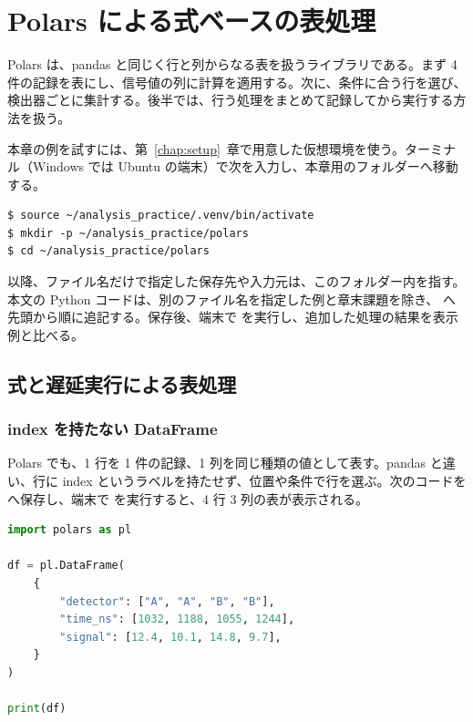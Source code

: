 \chapter{Polars による式ベースの表処理}
\label{chap:polars}

Polars は、pandas と同じく行と列からなる表を扱うライブラリである。まず 4 件の記録を表にし、信号値の列に計算を適用する。次に、条件に合う行を選び、検出器ごとに集計する。後半では、行う処理をまとめて記録してから実行する方法を扱う。

本章の例を試すには、第~\ref{chap:setup}~章で用意した仮想環境を使う。ターミナル（Windows では Ubuntu の端末）で次を入力し、本章用のフォルダーへ移動する。

\begin{lstlisting}[numbers=none, xleftmargin=2\zw]
$ source ~/analysis_practice/.venv/bin/activate
$ mkdir -p ~/analysis_practice/polars
$ cd ~/analysis_practice/polars
\end{lstlisting}

以降、ファイル名だけで指定した保存先や入力元は、このフォルダー内を指す。本文の Python コードは、別のファイル名を指定した例と章末課題を除き、 へ先頭から順に追記する。保存後、端末で  を実行し、追加した処理の結果を表示例と比べる。

\section{式と遅延実行による表処理}

\subsection{index を持たない DataFrame}

Polars でも、1 行を 1 件の記録、1 列を同じ種類の値として表す。pandas と違い、行に index というラベルを持たせず、位置や条件で行を選ぶ。次のコードを  へ保存し、端末で  を実行すると、4 行 3 列の表が表示される。

\begin{lstlisting}[language=Python]
import polars as pl

df = pl.DataFrame(
    {
        "detector": ["A", "A", "B", "B"],
        "time_ns": [1032, 1188, 1055, 1244],
        "signal": [12.4, 10.1, 14.8, 9.7],
    }
)

print(df)
\end{lstlisting}

